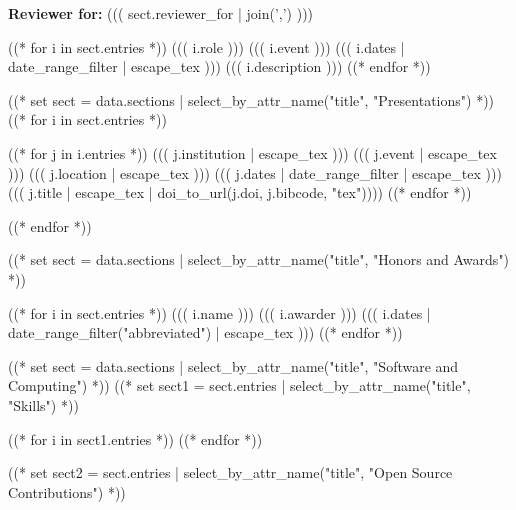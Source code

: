 \documentclass[10pt, letterpaper]{awesome-cv}
\begin{document}
\textbf{Reviewer for:} ((( sect.reviewer_for | join(',') )))

\begin{cventries}
((* for i in sect.entries *))
\cventry
  {((( i.role )))}
  {((( i.event )))}
  {}
  {((( i.dates | date_range_filter | escape_tex )))}
  {((( i.description )))}
((* endfor *))
\end{cventries}

((* set sect = data.sections | select_by_attr_name("title", "Presentations") *))
((* for i in sect.entries *))
\begin{cventries}
((* for j in i.entries *))
\cventry
  {((( j.institution | escape_tex )))}
  {((( j.event | escape_tex )))}
  {((( j.location | escape_tex )))}
  {((( j.dates | date_range_filter | escape_tex )))}
  {((( j.title | escape_tex | doi_to_url(j.doi, j.bibcode, "tex"))))}
((* endfor *))
\end{cventries}
((* endfor *))

((* set sect = data.sections | select_by_attr_name("title", "Honors and Awards") *))
\begin{cvhonors}
((* for i in sect.entries *))
\cvhonor
  {((( i.name )))}
  {((( i.awarder )))}
  {}
  {((( i.dates | date_range_filter("abbreviated") | escape_tex )))}
((* endfor *))
\end{cvhonors}

((* set sect = data.sections | select_by_attr_name("title", "Software and Computing") *))
((* set sect1 = sect.entries | select_by_attr_name("title", "Skills") *))
\begin{cvskills}
((* for i in sect1.entries *))
((* endfor *))
\end{cvskills}
((* set sect2 = sect.entries | select_by_attr_name("title", "Open Source Contributions") *))
\end{document}
